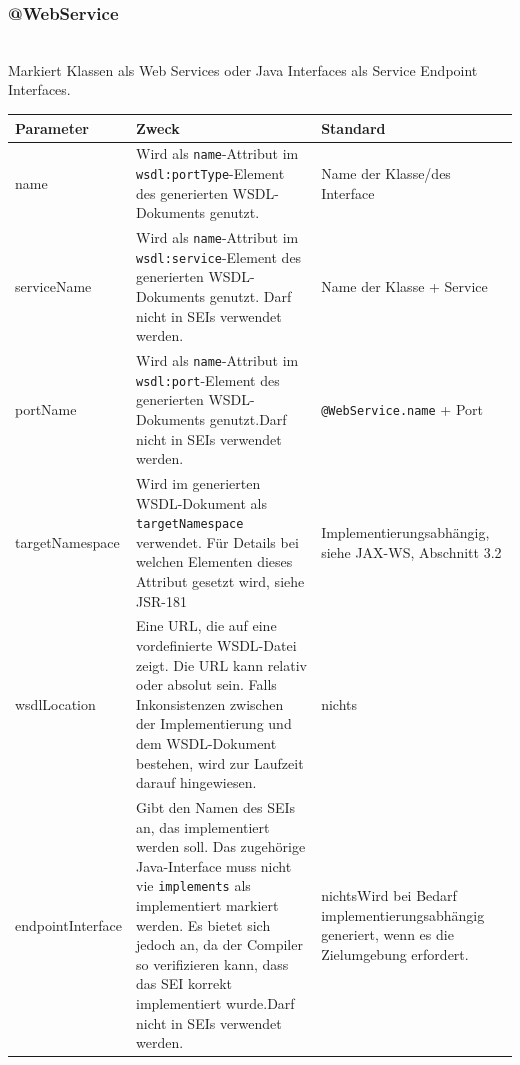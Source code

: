 \documentclass[runningheads]{llncs}
\newcommand{\germanquote}[1]{\glqq{}#1\grqq{}}
\newcommand{\anntabwidth}{\textwidth}
\begin{document}
    \subsubsection{@WebService}\ \\
      Markiert Klassen als Web Services oder Java Interfaces als Service Endpoint Interfaces.\\
    \begin{tabulary}{\anntabwidth}{|l|L|L|}
    \hline
    \textbf{Parameter} & \textbf{Zweck} & \textbf{Standard} \\
    \hline
      name &
      Wird als \texttt{name}-Attribut im \texttt{wsdl:portType}-Element des generierten WSDL-\linebreak[0]Dokuments genutzt. &
      Name der Klasse/\linebreak[0]des Interface \\
    \hline
      serviceName &
      Wird als \texttt{name}-Attribut im \texttt{wsdl:service}-Element des generierten WSDL-\linebreak[0]Dokuments genutzt. Darf nicht in SEIs verwendet werden. &
      Name der Klasse + \germanquote{Ser\-vice} \\
    \hline
      portName &
      Wird als \texttt{name}-Attribut im \texttt{wsdl:port}-Element des generierten WSDL-\linebreak[0]Dokuments genutzt.\newline Darf nicht in SEIs verwendet werden. &
      \texttt{@WebService.name} + \germanquote{Port} \\
    \hline
      targetNamespace &
      Wird im generierten WSDL-Dokument als \texttt{targetNamespace} verwendet. Für Details bei welchen Elementen dieses Attribut gesetzt wird, siehe JSR-181\cite{jsr_181} &
      Im\-ple\-men\-tier\-ungs\-ab\-häng\-ig, siehe JAX-WS\cite{jsr_224}, Abschnitt 3.2 \\
    \hline
      wsdlLocation &
      Eine URL, die auf eine vordefinierte WSDL-Datei zeigt. Die URL kann relativ oder absolut sein. Falls Inkonsistenzen zwischen der Implementierung und dem WSDL-Dokument bestehen, wird zur Laufzeit darauf hingewiesen. &
      nichts \\
    \hline
      endpointInterface &
      Gibt den Namen des SEIs an, das implementiert werden soll. Das zugehörige Java-Interface muss nicht vie \texttt{implements} als implementiert markiert werden. Es bietet sich jedoch an, da der Compiler so verifizieren kann, dass das SEI korrekt implementiert wurde.\newline Darf nicht in SEIs verwendet werden. &
      nichts\newline \newline Wird bei Bedarf im\-ple\-men\-tier\-ungs\-ab\-häng\-ig generiert, wenn es die Zielumgebung erfordert. \\
    \hline
    \end{tabulary} \vfill
\end{document}
